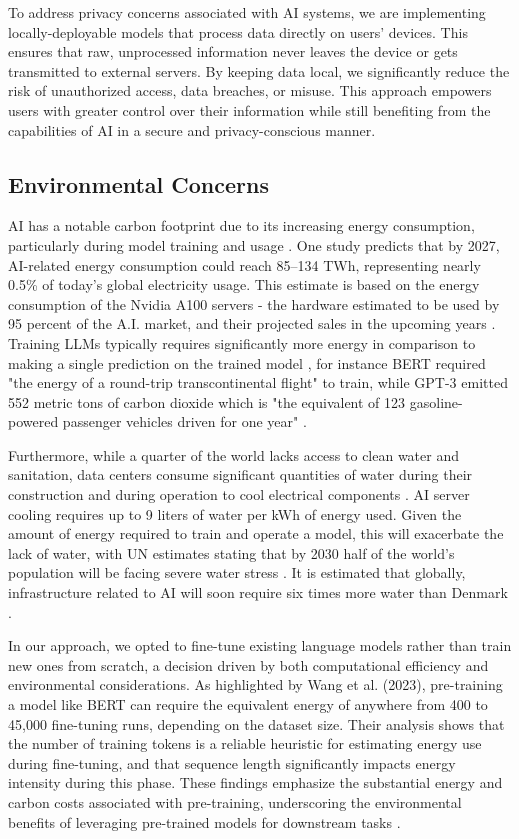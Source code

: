 \documentclass[licencjacka,en]{pracamgr}
\begin{document}
To address privacy concerns associated with AI systems, we are implementing locally-deployable models that process data directly on users' devices. This ensures that raw, unprocessed information never leaves the device or gets transmitted to external servers. By keeping data local, we significantly reduce the risk of unauthorized access, data breaches, or misuse. This approach empowers users with greater control over their information while still benefiting from the capabilities of AI in a secure and privacy-conscious manner. 
\subsection{Environmental Concerns}
AI has a notable carbon footprint due to its increasing energy consumption, particularly during model training and usage \cite{forbes_dl_env}. One study predicts that by 2027, AI-related energy consumption could reach 85–134 TWh, representing nearly 0.5\% of today's global electricity usage. This estimate is based on the energy consumption of the Nvidia A100 servers - the hardware estimated to be used by 95 percent of the A.I. market, and their projected sales in the upcoming years \cite{nyt_el}. Training LLMs typically requires significantly more energy in comparison to making a single prediction on the trained model \cite{sci_dir_comp}, for instance BERT required "the energy of a round-trip transcontinental flight" to train, while GPT-3 emitted 552 metric tons of carbon dioxide which is "the equivalent of 123 gasoline-powered passenger vehicles driven for one year" \cite{sci_am_co2}. 

Furthermore, while a quarter of the world lacks access to clean water and sanitation, data centers consume significant quantities of water during their construction and during operation to cool electrical components \cite{first}. AI server cooling requires up to 9 liters of water per kWh of energy used. Given the amount of energy required to train and operate a model, this will exacerbate the lack of water, with UN estimates stating that by 2030 half of the world’s population will be facing severe water stress \cite{water_scarcity}. It is estimated that globally, infrastructure related to AI will soon require six times more water than Denmark \cite{first}. 

In our approach, we opted to fine-tune existing language models rather than train new ones from scratch, a decision driven by both computational efficiency and environmental considerations. As highlighted by Wang et al. (2023), pre-training a model like BERT can require the equivalent energy of anywhere from 400 to 45,000 fine-tuning runs, depending on the dataset size. Their analysis shows that the number of training tokens is a reliable heuristic for estimating energy use during fine-tuning, and that sequence length significantly impacts energy intensity during this phase. These findings emphasize the substantial energy and carbon costs associated with pre-training, underscoring the environmental benefits of leveraging pre-trained models for downstream tasks \cite{finetuning_env_good}.
\end{document}
